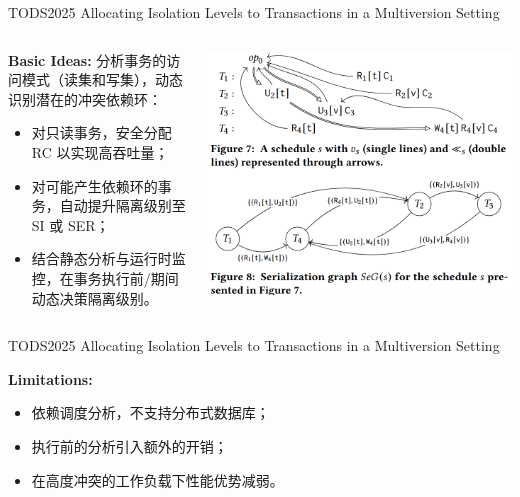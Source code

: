 \begin{frame}{TODS2025 Allocating Isolation Levels to Transactions in a Multiversion Setting}
	\begin{columns}
		\begin{column}{0.5\textwidth}
			\textbf{Basic Ideas: }分析事务的访问模式（读集和写集），动态识别潜在的冲突依赖环：
			\begin{itemize}
				\item 对只读事务，安全分配 RC 以实现高吞吐量；
				\item 对可能产生依赖环的事务，自动提升隔离级别至 SI 或 SER；
				\item 结合静态分析与运行时监控，在事务执行前/期间动态决策隔离级别。
			\end{itemize}
		\end{column}
		\begin{column}{0.5\textwidth}
			\includegraphics[width=0.98\linewidth]{figs/confliction-detect}
		\end{column}
	\end{columns}
\end{frame}

\begin{frame}{TODS2025 Allocating Isolation Levels to Transactions in a Multiversion Setting}

	\textbf{Limitations: }
	\begin{itemize}
		\item 依赖调度分析，不支持分布式数据库；
		\item 执行前的分析引入额外的开销；
		\item 在高度冲突的工作负载下性能优势减弱。
	\end{itemize}

\end{frame}
